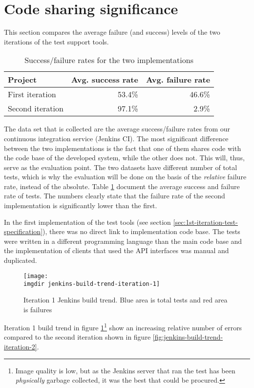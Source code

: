 \section{Code sharing significance}
\label{sec:domain-framework-significance}
This section compares the average failure (and success) levels of the two iterations of the test support tools.\medskip
\begin{table}[!htbp]
\centering
\begin{tabular}{ | l | r | r |}
   \hline
   Project          & Avg. success rate & Avg. failure rate \\ \hline
   First iteration  & 53.4\%            & 46.6\%            \\
   Second iteration & 97.1\%            & 2.9\%             \\
   \hline
\end{tabular}
\caption{Success/failure rates for the two implementations}
\label{tab:jenkins-failure-rates}
\end{table}
\noindent 
The data set that is collected are the average success/failure rates from our continuous integration service (Jenkins CI). The most significant difference between the two implementations is the fact that one of them shares code with the code base of the developed system, while the other does not. This will, thus, serve as the evaluation point. The two datasets have different number of total tests, which is why the evaluation will be done on the basis of the \emph{relative} failure rate, instead of the absolute. Table \ref{tab:jenkins-failure-rates} document the average success and failure rate of tests. The numbers clearly state that the failure rate of the second implementation is significantly lower than the first. \medskip

\noindent In the first implementation of the test tools (see section \ref{sec:1st-iteration-test-specification}), there was no direct link to implementation code base. The tests were written in a different programming language than the main code base and the implementation of clients that used the API interfaces was manual and duplicated.\medskip
\begin{figure}[!hbpt]
\centering
\texttt{[image: \\imgdir jenkins-build-trend-iteration-1]}
\caption{Iteration 1 Jenkins build trend. Blue area is total tests and red area is failures}
\label{fig:jenkins-build-trend-iteration-1}
\end{figure}

\noindent Iteration 1 build trend in figure \ref{fig:jenkins-build-trend-iteration-1}\footnote{Image quality is low, but as the Jenkins server that ran the test has been \emph{physically} garbage collected, it was the best that could be procured.} show an increasing relative number of errors compared to the second iteration shown in figure \ref{fig:jenkins-build-trend-iteration-2}.\medskip

